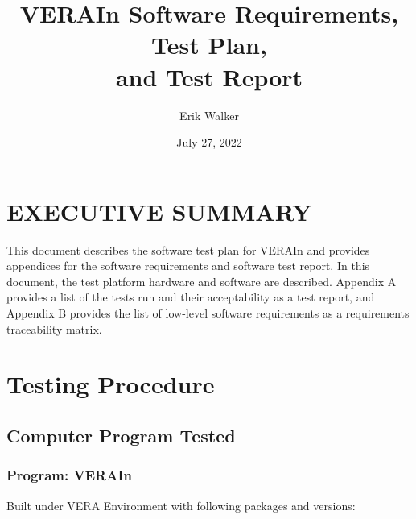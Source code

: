 \documentclass{vera-ornltm}
\author[1]{Erik Walker}
\affil[1]{Oak Ridge National Laboratory}
\title{VERAI\lowercase{n} Software Requirements, Test Plan, \protect\\and Test Report}
\date{July 27, 2022}
\renewcommand{\marginpar}[1]{{\small\em\color{note}[#1]}}
\begin{document}
\frontmatter



\section*{{EXECUTIVE SUMMARY}}

This document describes the software test plan for VERAIn and provides appendices for the software requirements and software test report. In this document, the test platform hardware and software are described. Appendix A provides a list of the tests run and their acceptability as a test report, and Appendix B provides the list of low-level software requirements as a requirements traceability matrix.

\tableofcontents
\setcounter{table}{0}

\mainmatter
\section{Testing Procedure}
\label{sec:test_procedure}

\subsection{Computer Program Tested}
\subsubsection{Program: VERAIn}
Built under VERA Environment with following packages and versions:

\end{document}
